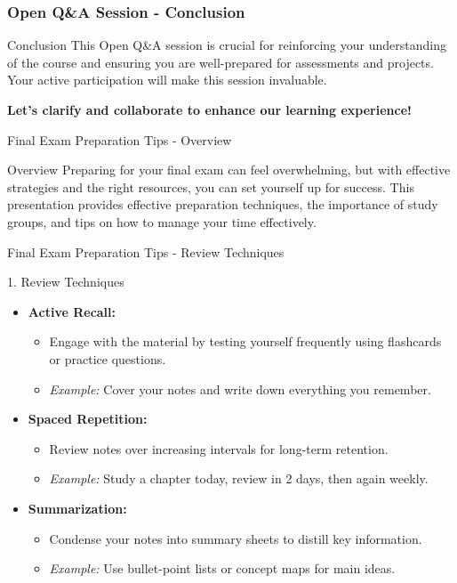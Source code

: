 \documentclass[aspectratio=169]{beamer}
\begin{document}
\begin{frame}[fragile]
    \frametitle{Open Q\&A Session - Conclusion}
    \begin{block}{Conclusion}
        This Open Q\&A session is crucial for reinforcing your understanding of the course and ensuring you are well-prepared for assessments and projects. Your active participation will make this session invaluable. 
        \begin{center}
            \textbf{Let’s clarify and collaborate to enhance our learning experience!}
        \end{center}
    \end{block}
\end{frame}

\begin{frame}[fragile]{Final Exam Preparation Tips - Overview}
    \begin{block}{Overview}
        Preparing for your final exam can feel overwhelming, but with effective strategies and the right resources, you can set yourself up for success. This presentation provides effective preparation techniques, the importance of study groups, and tips on how to manage your time effectively.
    \end{block}
\end{frame}

\begin{frame}[fragile]{Final Exam Preparation Tips - Review Techniques}
    \begin{block}{1. Review Techniques}
        \begin{itemize}
            \item \textbf{Active Recall:}
            \begin{itemize}
                \item Engage with the material by testing yourself frequently using flashcards or practice questions.
                \item \textit{Example:} Cover your notes and write down everything you remember.
            \end{itemize}
            \item \textbf{Spaced Repetition:}
            \begin{itemize}
                \item Review notes over increasing intervals for long-term retention.
                \item \textit{Example:} Study a chapter today, review in 2 days, then again weekly.
            \end{itemize}
            \item \textbf{Summarization:}
            \begin{itemize}
                \item Condense your notes into summary sheets to distill key information.
                \item \textit{Example:} Use bullet-point lists or concept maps for main ideas.
            \end{itemize}
        \end{itemize}
    \end{block}
\end{frame}
\end{document}
